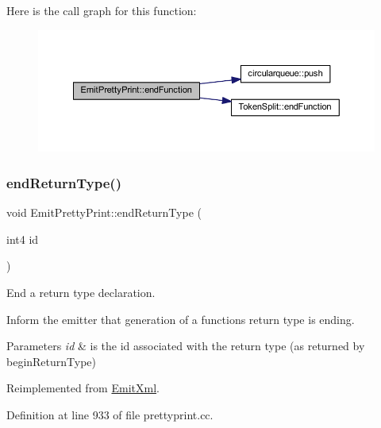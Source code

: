 Here is the call graph for this function\+:
\nopagebreak
\begin{figure}[H]
\begin{center}
\leavevmode
\includegraphics[width=350pt]{class_emit_pretty_print_a191b3722b5a08d9650dc7dc1216eac9d_cgraph}
\end{center}
\end{figure}
\mbox{\label{class_emit_pretty_print_a4ea26b7a3fad1f933665392fa682f4b1}} 
\subsubsection{\texorpdfstring{endReturnType()}{endReturnType()}}
{\footnotesize\ttfamily void Emit\+Pretty\+Print\+::end\+Return\+Type (\begin{DoxyParamCaption}\item[{int4}]{id }\end{DoxyParamCaption})\hspace{0.3cm}{\ttfamily [virtual]}}



End a return type declaration. 

Inform the emitter that generation of a function\textquotesingle{}s return type is ending. 
\begin{DoxyParams}{Parameters}
{\em id} & is the id associated with the return type (as returned by begin\+Return\+Type) \\
\hline
\end{DoxyParams}


Reimplemented from \mbox{\hyperlink{class_emit_xml_af7f778b3b2111e793d6ffd73017209f9}{Emit\+Xml}}.



Definition at line 933 of file prettyprint.\+cc.

